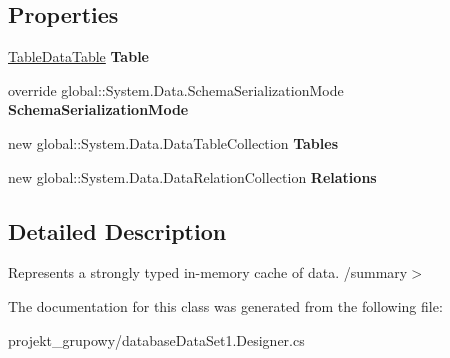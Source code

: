 \subsection*{Properties}
\begin{DoxyCompactItemize}
\item 
\mbox{\label{classprojekt__grupowy_1_1database_data_set1_af278335abbd6be2ee023ce745714cacf}} 
\hyperlink{classprojekt__grupowy_1_1database_data_set1_1_1_table_data_table}{Table\+Data\+Table} {\bfseries Table}
\item 
\mbox{\label{classprojekt__grupowy_1_1database_data_set1_addafd3689f4e85dee9ce7c375a5d5a5e}} 
override global\+::\+System.\+Data.\+Schema\+Serialization\+Mode {\bfseries Schema\+Serialization\+Mode}
\item 
\mbox{\label{classprojekt__grupowy_1_1database_data_set1_a48844d0d0248c84a68361dba6a3405c0}} 
new global\+::\+System.\+Data.\+Data\+Table\+Collection {\bfseries Tables}
\item 
\mbox{\label{classprojekt__grupowy_1_1database_data_set1_afba38adb4b0c9b2981f07f815c1ff029}} 
new global\+::\+System.\+Data.\+Data\+Relation\+Collection {\bfseries Relations}
\end{DoxyCompactItemize}


\subsection{Detailed Description}
Represents a strongly typed in-\/memory cache of data. /summary$>$ 

The documentation for this class was generated from the following file\+:\begin{DoxyCompactItemize}
\item 
projekt\+\_\+grupowy/database\+Data\+Set1.\+Designer.\+cs\end{DoxyCompactItemize}
